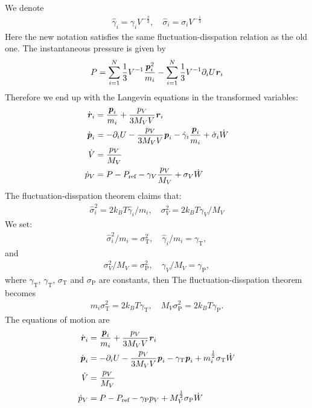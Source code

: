 \documentclass[aps, pre, preprint,unsortedaddress,a4paper,onecolumn]{revtex4}
\newcommand{\vect}[1]{\textbf{\textit{#1}}}
\newcommand{\target}{\textrm{ref}}
\newcommand{\temp}[0]{{\textrm{T}}}
\newcommand{\pres}[0]{{\textrm{P}}}
\begin{document}
We denote
\begin{align}
  \hat \gamma_i = \gamma_i V^{-\frac23}, \quad \hat \sigma_i = \sigma_i V^{-\frac13}
\end{align}
Here the new notation satisfies the same fluctuation-disspation relation as the old one.
The instantaneous pressure is given by
\begin{align}
  P =
  \sum_{i=1}^N \frac13 V^{-1} \frac{\vect p_i^2}{m_i}
  -
  \sum_{i=1}^N \frac13 V^{-1} \partial_i U  \vect r_i
\end{align}
Therefore we end up with the Langevin equations in the transformed variables:
\begin{align}
  \dot{\vect r}_i
  &= \frac{\vect p_i}{m_i} + \frac{p_V}{3M_VV} \vect r_i\\
  \dot{\vect p}_i
  & =
  -\partial_i U - \frac{p_V}{3M_VV}\vect p_i - \hat\gamma_i\frac{\vect p_i}{m_i}
  + \hat\sigma_i\dot W\\
  \dot{V} 
  &=
  \frac{p_V}{M_V} \\
  \dot{p}_V
  &=
  P - P_\target - \gamma_V  \frac{p_V}{M_V} + \sigma_V\dot W   
\end{align}
The fluctuation-disspation theorem claims that:
\begin{align}
  \hat \sigma_i^2 = 2k_BT \hat\gamma_i /m_i,\quad
  \sigma_V^2 = 2k_BT \gamma_V /M_V
\end{align}
We set:
\begin{align}
  \hat\sigma_i^2 / m_i = \sigma_\temp^2, \quad \hat\gamma_i / m_i = \gamma_\temp,
\end{align}
and
\begin{align}
  \sigma_V^2 / M_V = \sigma_\pres^2, \quad \gamma_V / M_V = \gamma_\pres,
\end{align}
where $\gamma_\temp$, $\gamma_\temp$, $\sigma_\temp$ and $\sigma_\pres$ are constants, then
The fluctuation-disspation theorem becomes
\begin{align}
  m_i\sigma_\temp^2 = 2k_BT \gamma_\temp ,\quad
  M_V\sigma_\pres^2 = 2k_BT \gamma_\pres.
\end{align}
The equations of motion are
\begin{align}\label{eq:eom-1}
  \dot{\vect r}_i
  &= \frac{\vect p_i}{m_i} + \frac{p_V}{3M_VV} \vect r_i\\\label{eq:eom-2}
  \dot{\vect p}_i
  & =
  -\partial_i U - \frac{p_V}{3M_VV}\vect p_i - \gamma_\temp{\vect p_i}
  + m_i^{\frac12}\sigma_\temp\dot W\\ \label{eq:eom-3}
  \dot{V} 
  &=
  \frac{p_V}{M_V} \\\label{eq:eom-4}
  \dot{p}_V
  &=
  P - P_\target - \gamma_\pres  {p_V} +M_V^{\frac12} \sigma_\pres\dot W   
\end{align}
\end{document}
